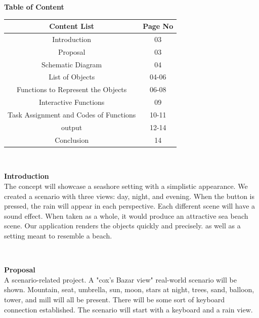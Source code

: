 \documentclass{article}
\begin{document}
\begin{center}
  \begin{code}
\textbf{Table of Content}

\end{code}  
\end{center}
\begin{center}
\begin{tabular}{c|c}
    \hline
   \textbf{Content List}  & \textbf{Page No} \\
    \hline
    Introduction & 03 \\
    \hline
    Proposal & 03 \\
    \hline
    Schematic Diagram & 04\\
    \hline
    List of Objects & 04-06 \\
    \hline
    Functions to Represent the Objects & 06-08 \\
    \hline
    Interactive Functions & 09 \\
    \hline
    Task Assignment and Codes of Functions & 10-11 \\
    \hline
    output & 12-14 \\
    \hline
    Conclusion & 14 \\
    
    
\end{tabular}
\\
\end{center}

\begin{center}
    \textbf{Introduction}
    \\
    The concept will showcase a seashore setting with a simplistic appearance. We created a scenario with three views: day, night, and evening. When the button is pressed, the rain will appear in each perspective. Each different scene will have a sound effect. When taken as a whole, it would produce an attractive sea beach scene. Our application renders the objects quickly and precisely. as well as a setting meant to resemble a beach.
\end{center}
\\
\begin{center}
    \textbf{Proposal}
    \\
    A scenario-related project. A "cox's Bazar view" real-world scenario will be shown. Mountain, seat, umbrella, sun, moon, stars at night, trees, sand, balloon, tower, and mill will all be present. There will be some sort of keyboard connection established. The scenario will start with a keyboard and a rain view.
\end{center}
\end{document}
